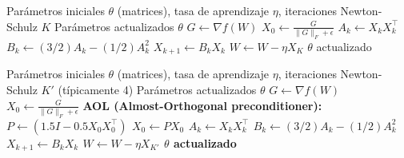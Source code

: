 \documentclass[11pt,a4paper]{article}
\begin{document}
\begin{algorithm}[H]
\caption{Muon (Ortogonalización de Newton-Schulz)}
\label{alg:muon}
\begin{algorithmic}[1]
\Require Parámetros iniciales $\theta$ (matrices), tasa de aprendizaje $\eta$, iteraciones Newton-Schulz $K$
\Ensure Parámetros actualizados $\theta$
    \State $G \gets \nabla f(W)$ 
    \State $X_0 \gets \frac{G}{\|G\|_F + \epsilon}$ 
        \State $A_k \gets X_k X_k^\top$ 
        \State $B_k \gets (3/2) A_k - (1/2) A_k^2$ 
        \State $X_{k+1} \gets B_k X_k$ 
    \EndFor
    \State $W \gets W - \eta X_K$ 
\EndFor
\Return $\theta$ actualizado
\end{algorithmic}
\end{algorithm}

\begin{algorithm}[H]
\caption{Turbo-Muon (Ortogonalización Precondicionada con AOL)}
\label{alg:turbo-muon}
\begin{algorithmic}[1]
\Require Parámetros iniciales $\theta$ (matrices), tasa de aprendizaje $\eta$, iteraciones Newton-Schulz $K'$ (típicamente 4)
\Ensure Parámetros actualizados $\theta$
    \State $G \gets \nabla f(W)$ 
    \State $X_0 \gets \frac{G}{\|G\|_F + \epsilon}$ 
    \State \bf{AOL (Almost-Orthogonal preconditioner):} 
    \State $P \gets (1.5 I - 0.5 X_0 X_0^\top)$ 
    \State $X_0 \gets P X_0$ 
        \State $A_k \gets X_k X_k^\top$
        \State $B_k \gets (3/2) A_k - (1/2) A_k^2$
        \State $X_{k+1} \gets B_k X_k$ 
    \EndFor
    \State $W \gets W - \eta X_{K'}$ 
\EndFor
\Return $\theta$ actualizado
\end{algorithmic}
\end{algorithm}
\end{document}
